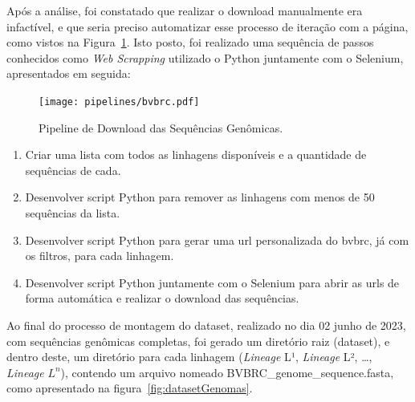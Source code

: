 Após a análise, foi constatado que realizar o download manualmente era infactível, e que seria preciso automatizar esse processo de iteração com a página, como vistos na Figura~\ref{fig:pipelineBvbrc}. Isto posto, foi realizado uma sequência de passos conhecidos como \textit{Web Scrapping} utilizado o Python juntamente com o Selenium, apresentados em seguida:

\begin{figure}[htb]
  \centering
  \caption{Pipeline de Download das Sequências Genômicas.}
  \texttt{[image: pipelines/bvbrc.pdf]}
  ~\label{fig:pipelineBvbrc}
\end{figure}

\begin{enumerate}
  \item Criar uma lista com todos as linhagens disponíveis e a quantidade de sequências de cada.
  \item Desenvolver script Python para remover as linhagens com menos de 50 sequências da lista.
  \item Desenvolver script Python para gerar uma url personalizada do \gls{bvbrc}, já com os filtros, para cada linhagem.
  \item Desenvolver script Python juntamente com o Selenium para abrir as urls de forma automática e realizar o download das sequências.
\end{enumerate}

Ao final do processo de montagem do dataset, realizado no dia 02 junho de 2023, com sequências genômicas completas, foi gerado um diretório raiz (dataset), e dentro deste, um diretório para cada linhagem (\textit{Lineage} L¹, \textit{Lineage} L², \dots, \textit{Lineage} $L^{n}$), contendo um arquivo nomeado \textnormal{BVBRC\_genome\_sequence.fasta}, como apresentado na figura~\ref{fig:datasetGenomas}.

